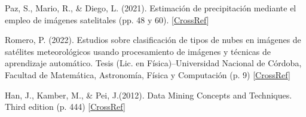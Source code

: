 \documentclass[twocolumn]{IECEjournal} %
\begin{document}
\begin{fullwidth}
\begin{thebibliography}{99}
 Paz, S., Mario, R., \& Diego, L. (2021). Estimación de precipitación mediante el empleo de  imágenes satelitales (pp. 48 y 60). [\href{https://hdl.handle.net/20.500.12542/1470}{CrossRef}]

 Romero, P. (2022). Estudios sobre clasificación de tipos de nubes en imágenes de satélites meteorológicos usando procesamiento de imágenes y técnicas de aprendizaje automático. Tesis (Lic. en Física)--Universidad Nacional de Córdoba, Facultad de Matemática, Astronomía, Física y Computación (p. 9) [\href{http://hdl.handle.net/11086/24824}{CrossRef}]

 Han, J., Kamber, M., \& Pei, J.(2012). Data Mining Concepts and Techniques. Third edition (p. 444) [\href{https://doi.org/10.1016/C2009-0-61819-5}{CrossRef}]
\end{thebibliography}
\end{fullwidth}

\makeatletter
\if@twocolumn

\else

\fi

\makeatother
\end{document}

